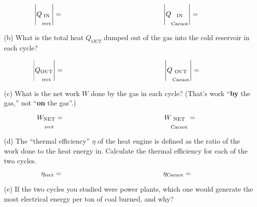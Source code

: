 \begin{displaymath}
\hspace{-0.5in} \left| Q_{\substack{\textrm{IN} \\ \\ \textrm{rect}}} \right| =
\hspace{2in} \left| Q_{\substack{\textrm{IN} \\ \\ \textrm{Carnot}}} \right|=
\end{displaymath}

(b) What is the total heat $Q_{OUT}$ dumped out of the gas into the cold reservoir in each cycle?

\begin{displaymath}
\hspace{-0.5in} \left| Q_{\substack{\textrm{OUT} \\ \\ \textrm{rect}}} \right| =
\hspace{2in} \left| Q_{\substack{\textrm{OUT} \\ \\ \textrm{Carnot}}} \right|=
\end{displaymath}

(c)  What is the net work $W$ done by the gas in each cycle?  (That's work ``\textbf{by} the gas,'' not ``\textbf{on} the gas''.) 

\begin{displaymath}
\hspace{-0.5in} W_{\substack{\textrm{NET} \\ \\ \textrm{rect}}} =
\hspace{2in} W_{\substack{\textrm{NET} \\ \\ \textrm{Carnot}}} =
\end{displaymath}

(d)  The ``thermal efficiency'' $\eta$ of the heat engine is defined as the ratio of the work done to the heat energy in.  Calculate the thermal efficiency for each of the two cycles.

\begin{displaymath}
\hspace{-0.5in} \eta_{\rm rect} =
\hspace{2in} \eta_{\rm Carnot} =
\end{displaymath}

\bigskip

(e) If the two cycles you studied were power plants, which one would generate the most electrical energy per ton of coal burned, and why?





